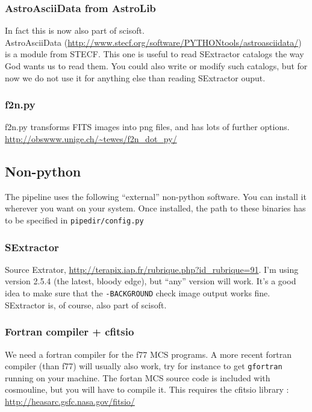 \subsubsection{AstroAsciiData from AstroLib}

In fact this is now also part of scisoft.\\
AstroAsciiData (\url{http://www.stecf.org/software/PYTHONtools/astroasciidata/}) is a module from STECF. This one is useful to read SExtractor catalogs the way God wants us to read them. You could also write or modify such catalogs, but for now we do not use it for anything else than reading SExtractor ouput.

\subsubsection{f2n.py}

f2n.py transforms FITS images into png files, and has lots of further options.\\
\url{http://obswww.unige.ch/~tewes/f2n_dot_py/}


\subsection{Non-python}

The pipeline uses the following ``external'' non-python software. You can install it wherever you want on your system. Once installed, the path to these binaries has to be specified in \verb+pipedir/config.py+

\subsubsection{SExtractor}
Source Extrator, \url{http://terapix.iap.fr/rubrique.php?id_rubrique=91}. I'm using version 2.5.4 (the latest, bloody edge), but ``any'' version will work. It's a good idea to make sure that the \verb+-BACKGROUND+ check image output works fine. SExtractor is, of course, also part of scisoft.

\subsubsection{Fortran compiler + cfitsio}
We need a fortran compiler for the f77 MCS programs. A more recent fortran compiler (than f77) will usually also work, try for instance to get \verb+gfortran+ running on your machine. The fortan MCS source code is included with cosmouline, but you will have to compile it. This requires the cfitsio library :
\url{http://heasarc.gsfc.nasa.gov/fitsio/}

